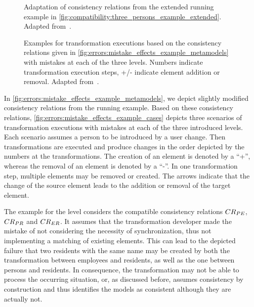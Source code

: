 \begin{figure}
    \centering
    
    \caption[Adaptation of consistency relations from running example]{Adaptation of consistency relations from the extended running example in \autoref{fig:compatibility:three_persons_example_extended}. Adapted from~.}
    \label{fig:errors:mistake_effects_example_metamodels}
\end{figure}

\begin{figure}
    \centering
    
    \caption[Examples for mistakes at each level]{Examples for transformation executions based on the consistency relations given in \autoref{fig:errors:mistake_effects_example_metamodels} with mistakes at each of the three levels. Numbers indicate transformation execution steps, +/- indicate element addition or removal. Adapted from~.}
    \label{fig:errors:mistake_effects_example_cases}
\end{figure}

In \autoref{fig:errors:mistake_effects_example_metamodels}, we depict slightly modified consistency relations from the running example.
Based on these consistency relations, \autoref{fig:errors:mistake_effects_example_cases} depicts three scenarios of transformation executions with mistakes at each of the three introduced levels.
Each scenario assumes a person to be introduced by a user change.
Then transformations are executed and produce changes in the order depicted by the numbers at the transformations.
The creation of an element is denoted by a \enquote{+}, whereas the removal of an element is denoted by a \enquote{-}.
In one transformation step, multiple elements may be removed or created.
The arrows indicate that the change of the source element leads to the addition or removal of the target element.

The example for the \leveltransformation level considers the compatible consistency relations $\consistencyrelation{CR}{PE}$, $\consistencyrelation{CR}{PR}$ and $\consistencyrelation{CR}{ER}$. It assumes that the transformation developer made the mistake of not considering the necessity of synchronization, thus not implementing a matching of existing elements.
This can lead to the depicted failure that two residents with the same name may be created by both the transformation between employees and residents, as well as the one between persons and residents.
In consequence, the transformation may not be able to process the occurring situation, or, as discussed before,  assumes consistency by construction and thus identifies the models as consistent although they are actually not.

